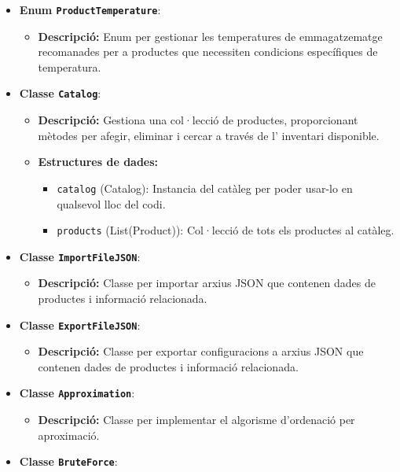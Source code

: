 \documentclass[a4paper,12pt]{report}
\begin{document}
\begin{itemize}
\begin{itemize}
\begin{itemize}
			\end{itemize}
		\end{itemize}
		\item \textbf{Enum \texttt{ProductTemperature}}:
		\begin{itemize}
			\item \textbf{Descripció:} Enum per gestionar les temperatures de emmagatzematge recomanades per a productes que necessiten condicions específiques de temperatura.
		\end{itemize}
		\item \textbf{Classe \texttt{Catalog}}:
		\begin{itemize}
			\item \textbf{Descripció:} Gestiona una col·lecció de productes, proporcionant mètodes per afegir, eliminar i cercar a través de l' inventari disponible.
			\item \textbf{Estructures de dades:}
			\begin{itemize}
				\item \texttt{catalog} (Catalog): Instancia del catàleg per poder usar-lo en qualsevol lloc del codi.
				\item \texttt{products} (List(Product)): Col·lecció de tots els productes al catàleg.
			\end{itemize}
		\end{itemize}
		\item \textbf{Classe \texttt{ImportFileJSON}}:
		\begin{itemize}
			\item \textbf{Descripció:} Classe per importar arxius JSON que contenen dades de productes i informació relacionada.
		\end{itemize}
		\item \textbf{Classe \texttt{ExportFileJSON}}:
		\begin{itemize}
			\item \textbf{Descripció:} Classe per exportar configuracions a arxius JSON que contenen dades de productes i informació relacionada.
		\end{itemize}
		\item \textbf{Classe \texttt{Approximation}}:
		\begin{itemize}
			\item \textbf{Descripció:} Classe per implementar el algorisme d'ordenació per aproximació.
		\end{itemize}
		\item \textbf{Classe \texttt{BruteForce}}:
		\begin{itemize}

\end{itemize}
\end{itemize}
\end{document}
